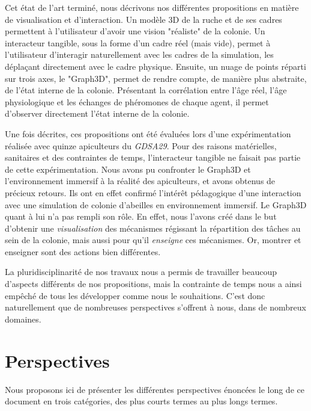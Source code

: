 Cet état de l'art terminé, nous décrivons nos différentes propositions en matière de visualisation et d'interaction. Un modèle 3D de la ruche et de ses cadres permettent à l'utilisateur d'avoir une vision "réaliste" de la colonie. Un interacteur tangible, sous la forme d'un cadre réel (mais vide), permet à l'utilisateur d'interagir naturellement avec les cadres de la simulation, les déplaçant directement avec le cadre physique. Ensuite, un nuage de points réparti sur trois axes, le "Graph3D", permet de rendre compte, de manière plus abstraite, de l'état interne de la colonie. Présentant la corrélation entre l'âge réel, l'âge physiologique et les échanges de phéromones de chaque agent, il permet d'observer directement l'état interne de la colonie.

Une fois décrites, ces propositions ont été évaluées lors d'une expérimentation réalisée avec quinze apiculteurs du \textit{GDSA29}. Pour des raisons matérielles, sanitaires et des contraintes de temps, l'interacteur tangible ne faisait pas partie de cette expérimentation. Nous avons pu confronter le Graph3D et l'environnement immersif à la réalité des apiculteurs, et avons obtenus de précieux retours. Ils ont en effet confirmé l'intérêt pédagogique d'une interaction avec une simulation de colonie d'abeilles en environnement immersif. Le Graph3D quant à lui n'a pas rempli son rôle. En effet, nous l'avons créé dans le but d'obtenir une \textit{visualisation} des mécanismes régissant la répartition des tâches au sein de la colonie, mais aussi pour qu'il \textit{enseigne} ces mécanismes. Or, montrer et enseigner sont des actions bien différentes.
	
	 La pluridisciplinarité de nos travaux nous a permis de travailler beaucoup d'aspects différents de nos propositions, mais la contrainte de temps nous a ainsi empêché de tous les développer comme nous le souhaitions. C'est donc naturellement que de nombreuses perspectives s'offrent à nous, dans de nombreux domaines.
	
\section*{Perspectives}
	Nous proposons ici de présenter les différentes perspectives énoncées le long de ce document en trois catégories, des plus courts termes au plus longs termes.
	
